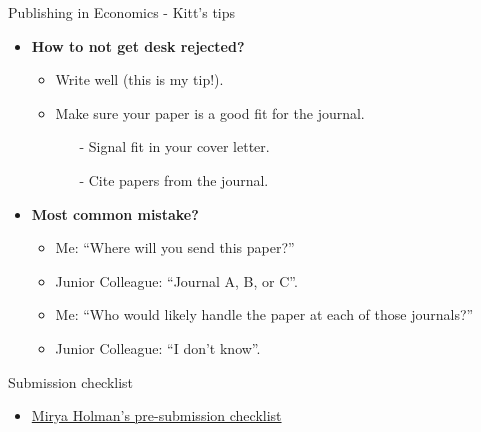 \documentclass{beamer}
\begin{document}
\begin{frame}{Publishing in Economics - Kitt's tips}
    \begin{itemize}
        \item \textbf{How to not get desk rejected?}
        \begin{itemize}
            \item Write well (this is my tip!).
            \item Make sure your paper is a good fit for the journal.
            \begin{itemize}
                \item[-] Signal fit in your cover letter.
                \item[-] Cite papers from the journal.
            \end{itemize}
        \end{itemize}
        \medskip
        \pause \item \textbf{Most common mistake?}
        \begin{itemize}
            \item Me: “Where will you send this paper?”  
            \item Junior Colleague: “Journal A, B, or C”.  
            \item Me: “Who would likely handle the paper at each of those journals?”  
            \item Junior Colleague: “I don’t know”. 
        \end{itemize}
    \end{itemize}
\end{frame}

\begin{frame}{Submission checklist}
    \begin{itemize}
        \item \color{blue} \href{https://docs.google.com/document/d/1JwwmOgRhd2p-Bl_RFEMnp04P0I2nNhOHW7JHdaLcyGs/edit}{Mirya Holman's pre-submission checklist}
    \end{itemize}
\end{frame}
\end{document}
